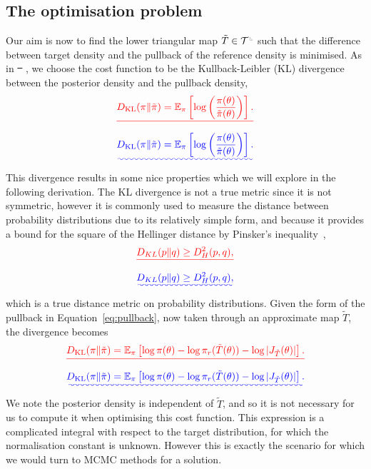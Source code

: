 \documentclass[final]{siamltex}
\newcommand{\ltri}{%
\,\resizebox{!}{0.25\baselineskip}{%
\begin{tikzpicture}%
\draw[line width=1mm](0,0) -- (0,2) -- (2,0)  -- (0,0);
\end{tikzpicture}%
}\xspace%
}%
\providecommand{\DIFadd}[1]{{\protect\color{blue}\uwave{#1}}} %
\providecommand{\DIFdel}[1]{{\protect\color{red}\sout{#1}}}                      %
\providecommand{\DIFaddbegin}{} %
\providecommand{\DIFaddend}{} %
\providecommand{\DIFdelbegin}{} %
\providecommand{\DIFdelend}{} %
\newcommand{\DIFscaledelfig}{0.5}
\newlength{\DIFdelgraphicswidth} %
\newlength{\DIFdelgraphicsheight} %
\newcommand{\DIFaddincludegraphics}[2][]{{\color{blue}\fbox{\DIFOincludegraphics[#1]{#2}}}} %
\newcommand{\DIFdelincludegraphics}[2][]{%
\sbox{\DIFdelgraphicsbox}{\DIFOincludegraphics[#1]{#2}}%
\settoboxwidth{\DIFdelgraphicswidth}{\DIFdelgraphicsbox} %
\settoboxtotalheight{\DIFdelgraphicsheight}{\DIFdelgraphicsbox} %
\scalebox{\DIFscaledelfig}{%
\parbox[b]{\DIFdelgraphicswidth}{\usebox{\DIFdelgraphicsbox}\\[-\baselineskip] \rule{\DIFdelgraphicswidth}{0em}}\llap{\resizebox{\DIFdelgraphicswidth}{\DIFdelgraphicsheight}{%
\setlength{\unitlength}{\DIFdelgraphicswidth}%
\begin{picture}(1,1)%
\thicklines\linethickness{2pt} %
{\color[rgb]{1,0,0}\put(0,0){\framebox(1,1){}}}%
{\color[rgb]{1,0,0}\put(0,0){\line( 1,1){1}}}%
{\color[rgb]{1,0,0}\put(0,1){\line(1,-1){1}}}%
\end{picture}%
}\hspace*{3pt}}} %
} %
\DeclareRobustCommand{\DIFaddbegin}{\DIFOaddbegin \let\includegraphics\DIFaddincludegraphics} %
\DeclareRobustCommand{\DIFaddend}{\DIFOaddend \let\includegraphics\DIFOincludegraphics} %
\DeclareRobustCommand{\DIFdelbegin}{\DIFOdelbegin \let\includegraphics\DIFdelincludegraphics} %
\DeclareRobustCommand{\DIFdelend}{\DIFOaddend \let\includegraphics\DIFOincludegraphics} %
\begin{document}
\subsection{The optimisation problem}
Our aim is now to find the lower triangular map $\tilde{T} \in
\mathcal{T}^{\ltri}$ such that the difference between target
density and the pullback of the reference density is minimised. As in
\DIFdelbegin \DIFdel{\mbox{%
\cite{parno2014transport}}\hspace{0pt}%
}\DIFdelend \DIFaddbegin \DIFadd{\mbox{%
\cite{parno2018transport}}\hspace{0pt}%
}\DIFaddend , we choose the cost function
to be the Kullback-Leibler (KL) divergence between the posterior density and the pullback density,
\DIFdelbegin \[
	\DIFdel{D_\text{KL}(\pi\|\tilde{\pi}) =
		\mathbb{E}_\pi\left[\log\left(\frac{\pi(\theta)}{\tilde{\pi}(\theta)}\right)\right].
}\]
\DIFdelend \DIFaddbegin \begin{equation}
	\DIFadd{D_\text{KL}(\pi\|\tilde{\pi}) =
		\mathbb{E}_\pi\left[\log\left(\frac{\pi(\theta)}{\tilde{\pi}(\theta)}\right)\right].
}\end{equation}
\DIFaddend This divergence results in some nice properties which we will explore in the following derivation. The KL divergence is not a true metric since it is not symmetric, however it is commonly used to measure the distance between probability distributions due to its relatively simple form, and because it provides a bound for the square of the Hellinger distance by Pinsker's inequality~\cite{pinsker1960information},
\DIFdelbegin \[
	\DIFdel{D_{KL}(p\|q) \geq D_H^2(p,q),
}\]
\DIFdelend \DIFaddbegin \begin{equation}
	\DIFadd{D_{KL}(p\|q) \geq D_H^2(p,q),
}\end{equation}
\DIFaddend which is a true distance metric on probability distributions.
Given the form of the pullback in Equation~\eqref{eq:pullback}, now taken through an approximate map $\tilde{T}$, the divergence becomes
\DIFdelbegin \[
	\DIFdel{D_\text{KL}(\pi\|\tilde{\pi}) = \mathbb{E}_\pi\left[\log\pi(\theta) - \log\pi_r(\tilde{T}(\theta)) -
		\log\left|J_{\tilde{T}}(\theta)\right|\right].
}\]
\DIFdelend \DIFaddbegin \begin{equation}
	\DIFadd{D_\text{KL}(\pi\|\tilde{\pi}) = \mathbb{E}_\pi\left[\log\pi(\theta) - \log\pi_r(\tilde{T}(\theta)) -
		\log\left|J_{\tilde{T}}(\theta)\right|\right].
}\end{equation}
\DIFaddend We note the posterior density is independent of $\tilde{T}$, and so it is not necessary for us to compute it when optimising this cost function. This expression is a complicated integral with respect to the target distribution, for which the normalisation constant is unknown. However this is exactly the scenario for which we would turn to MCMC methods for a solution.
\end{document}
